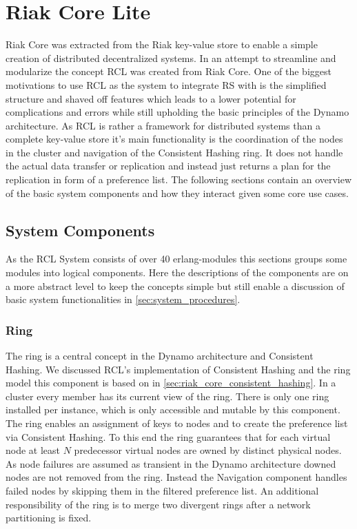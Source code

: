 \section{Riak Core Lite} 
\label{sec:riak_core_lite}
Riak Core was extracted from the Riak key-value store to enable a simple creation of distributed decentralized systems.
In an attempt to streamline and modularize the concept \ac{RCL}\cite{RiakCoreLiteTeam2020} was created from Riak Core.
One of the biggest motivations to use \ac{RCL} as the system to integrate \ac{RS} with is the simplified structure and shaved off features which leads to a lower potential for complications and errors while still upholding the basic principles of the Dynamo architecture.
As \ac{RCL} is rather a framework for distributed systems than a complete key-value store it's main functionality is the coordination of the nodes in the cluster and navigation of the Consistent Hashing ring.
It does not handle the actual data transfer or replication and instead just returns a plan for the replication in form of a preference list.
The following sections contain an overview of the basic system components and how they interact given some core use cases.

\subsection{System Components}
As the \ac{RCL} System consists of over 40 erlang-modules this sections groups some modules into logical components.
Here the descriptions of the components are on a more abstract level to keep the concepts simple but still enable a discussion of basic system functionalities in \cref{sec:system_procedures}.

\subsubsection{Ring}
	The ring is a central concept in the Dynamo architecture and Consistent Hashing.
	We discussed \ac{RCL}'s implementation of Consistent Hashing and the ring model this component is based on in \cref{sec:riak_core_consistent_hashing}.
	In a cluster every member has its current view of the ring.
	There is only one ring installed per instance, which is only accessible and mutable by this component.
	The ring enables an assignment of keys to nodes and to create the preference list via Consistent Hashing.
	To this end the ring guarantees that for each virtual node at least $N$ predecessor virtual nodes are owned by distinct physical nodes.
	As node failures are assumed as transient in the Dynamo architecture downed nodes are not removed from the ring.
	Instead the Navigation component handles failed nodes by skipping them in the filtered preference list.
	An additional responsibility of the ring is to merge two divergent rings after a network partitioning is fixed.

